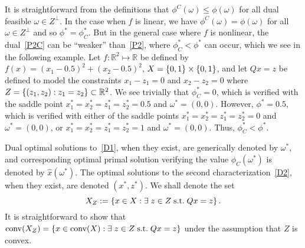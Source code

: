 It is straightforward from the definitions that $\phi^C(\omega) \le \phi(\omega)$ for all dual feasible $\omega \in Z^\perp$. 
In the case when $f$ is linear, we have $\phi^C(\omega) = \phi(\omega)$ for all $\omega \in Z^\perp$ and so $\phi^*=\phi_C^*$.
But in the general case where $f$ is nonlinear, the dual~\eqref{P2C} can be ``weaker'' than~\eqref{P2}, where $\phi_C^* < \phi^*$ can occur,
which we see in the following example.
Let $f : \mathbb{R}^2 \mapsto \mathbb{R}$ be defined by $f(x)=(x_1-0.5)^2+(x_2-0.5)^2$, $X=\left\{ 0,1 \right \} \times \left\{ 0,1 \right \}$, and let $Qx=z$ be defined to model the constraints $x_1 -z_1 = 0$ and $x_2 - z_2 = 0$ where $Z = \left\{ (z_1,z_2) : z_1=z_2 \right \} \subset \mathbb{R}^2$. We see trivially that $\phi_C^* = 0$, which is verified with the saddle point $x_1^*=x_2^*=z_1^*=z_2^*=0.5$ and $\omega^*=(0,0)$. However,
$\phi^* = 0.5$, which is verified with either of the saddle points $x_1^*=x_2^*=z_1^*=z_2^*=0$ and $\omega^*=(0,0)$, or $x_1^*=x_2^*=z_1^*=z_2^*=1$ and $\omega^*=(0,0)$. Thus,  $\phi_C^* < \phi^*$.

Dual optimal solutions to~\eqref{D1}, when they exist, are generically denoted by $\omega^*$, and corresponding optimal primal solution verifying the value $\phi_C(\omega^*)$ is denoted by $\widehat{x}(\omega^*)$. The optimal solutions to the second characterization~\eqref{D2}, when they exist, are denoted $(x^*,z^*)$. We shall denote the set 
$$X_Z := \left\{  x \in X : \exists \; z \in Z \; \text{s.t.} \; Qx=z \right \}.$$ 
It is straightforward to show that $\operatorname{conv}(X_Z) = \left\{ x \in \operatorname{conv}(X)  : \exists \; z \in Z \; \text{s.t.} \; Qx=z \right \}$ under the assumption that $Z$ is convex.

